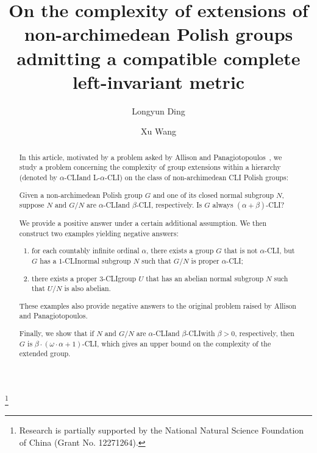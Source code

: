 \documentclass[11pt]{amsart}
\theoremstyle{definition}
\theoremstyle{remark}
\numberwithin{equation}{section}
\def\hier#1{$#1$-CLI}
\begin{document}
\title[On the complexity of extensions of non-archimedean CLI groups]{On the complexity of extensions of non-archimedean Polish groups admitting a compatible complete left-invariant metric}
\author{Longyun Ding}
\address{School of Mathematical Sciences and LPMC, Nankai University, Tianjin, 300071, P.R.China}
\thanks{Research is partially supported by the National Natural Science Foundation of China (Grant No. 12271264).}
\author{Xu Wang}





\begin{abstract}
    In this article, motivated by a problem asked by Allison and Panagiotopoulos~\cite{SAllisonAPana}, we study a problem concerning the complexity of group extensions within a hierarchy (denoted by \hier\alpha\space and L-\hier\alpha) on the class of non-archimedean CLI Polish groups:

    Given a non-archimedean Polish group $G$ and one of its closed normal subgroup $N$, suppose $N$ and $G/N$ are \hier\alpha\space and \hier\beta, respectively. Is $G$ always \hier{(\alpha+\beta)}?

    We provide a positive answer under a certain additional assumption. We then construct two examples yielding negative answers:
    \begin{enumerate}
        \item for each countably infinite ordinal $\alpha$, there exists a group $G$ that is not \hier\alpha, but $G$ has a \hier1\space normal subgroup $N$ such that $G/N$ is proper \hier\alpha;
        \item there exists a proper \hier3\space group $U$ that has an abelian normal subgroup $N$ such that $U/N$ is also abelian.
    \end{enumerate}
    These examples also provide negative answers to the original problem raised by Allison and Panagiotopoulos.

    Finally, we show that if $N$ and $G/N$ are \hier\alpha\space and \hier\beta\space with $\beta>0$, respectively, then $G$ is \hier{\beta\cdot(\omega\cdot\alpha+1)}, which gives an upper bound on the complexity of the extended group.


\end{abstract}
\end{document}
